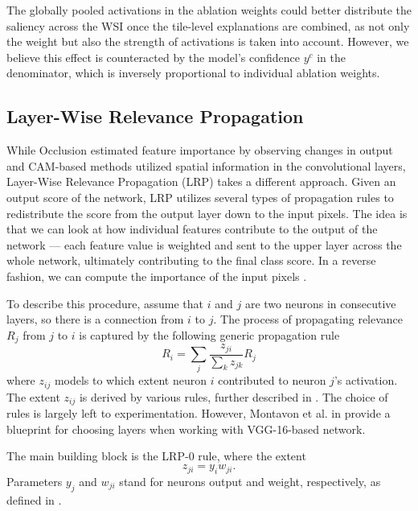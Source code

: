 The globally pooled activations in the ablation weights could better distribute the saliency across the WSI once the tile-level explanations are combined, as not only the weight but also the strength of activations is taken into account.
However, we believe this effect is counteracted by the model's confidence $y^c$ in the denominator, which is inversely proportional to individual ablation weights.

\subsection{Layer-Wise Relevance Propagation}

While Occlusion estimated feature importance by observing changes in output and CAM-based methods utilized spatial information in the convolutional layers, Layer-Wise Relevance Propagation (LRP) \cite{lrp} takes a different approach.
Given an output score of the network, LRP utilizes several types of propagation rules to redistribute the score from the output layer down to the input pixels.
The idea is that we can look at how individual features contribute to the output of the network --- each feature value is weighted and sent to the upper layer across the whole network, ultimately contributing to the final class score.
In a reverse fashion, we can compute the importance of the input pixels \cite{lrp}.

To describe this procedure, assume that $i$ and $j$ are two neurons in consecutive layers, so there is a connection from $i$ to $j$. 
The process of propagating relevance $R_j$ from $j$ to $i$ is captured by the following generic propagation rule \cite{lrp}
\begin{equation}
    R_i = \sum_j \frac{z_{ji}}{\sum_k z_{jk}} R_j
\end{equation}
where $z_{ij}$ models to which extent neuron $i$ contributed to neuron $j$'s activation.
The extent $z_{ij}$ is derived by various rules, further described in \cite{lrp}.
The choice of rules is largely left to experimentation.
However, Montavon et al. in \cite{lrp} provide a blueprint for choosing layers when working with VGG-16-based network.

The main building block is the LRP-$0$ rule, where the extent
\begin{equation}
    z_{ji} = y_i w_{ji}.
\end{equation}
Parameters $y_j$ and $w_{ji}$ stand for neurons output and weight, respectively, as defined in .

